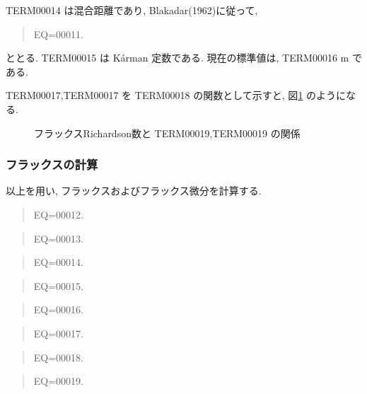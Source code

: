 TERM00014 は混合距離であり, Blakadar(1962)に従って,
\begin{quote}
EQ=00011.
\end{quote}
ととる. 
TERM00015 は K\'{a}rman 定数である. 
%
% 
現在の標準値は, TERM00016 m である.

TERM00017,TERM00017 を TERM00018 の関数として示すと,
図\ref{p-dif:smsh-rif} のようになる.

\begin{figure}[htbp]
  \begin{center}
    \caption{フラックスRichardson数と TERM00019,TERM00019 の関係}
    \label{p-dif:smsh-rif}
  \end{center}
\end{figure}


\subsubsection{フラックスの計算}

以上を用い, フラックスおよびフラックス微分を計算する.

\begin{quote}
EQ=00012.
\end{quote}
\begin{quote}
EQ=00013.
\end{quote}
\begin{quote}
EQ=00014.
\end{quote}
\begin{quote}
EQ=00015.
\end{quote}

\begin{quote}
EQ=00016.
\end{quote}
\begin{quote}
EQ=00017.
\end{quote}
\begin{quote}
EQ=00018.
\end{quote}
\begin{quote}
EQ=00019.
\end{quote}

